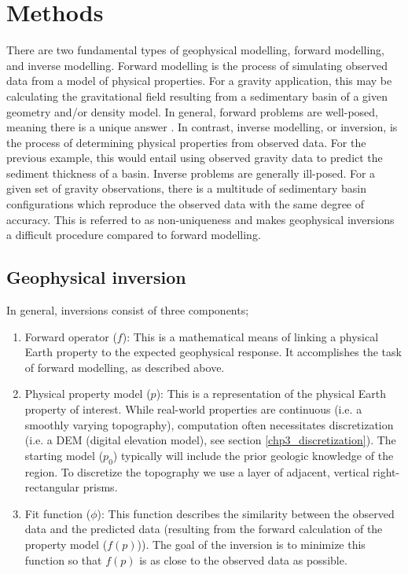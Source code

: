 \section{Methods}

There are two fundamental types of geophysical modelling, forward modelling, and inverse modelling. Forward modelling is the process of simulating observed data from a model of physical properties. For a gravity application, this may be calculating the gravitational field resulting from a sedimentary basin of a given geometry and/or density model. In general, forward problems are well-posed, meaning there is a unique answer \citep{oldenburginversion2005}. In contrast, inverse modelling, or inversion, is the process of determining physical properties from observed data. For the previous example, this would entail using observed gravity data to predict the sediment thickness of a basin. Inverse problems are generally ill-posed. For a given set of gravity observations, there is a multitude of sedimentary basin configurations which reproduce the observed data with the same degree of accuracy. This is referred to as non-uniqueness and makes geophysical inversions a difficult procedure compared to forward modelling.

\subsection{Geophysical inversion}

In general, inversions consist of three components;

\begin{enumerate}
    \item Forward operator ($f$): This is a mathematical means of linking a physical Earth property to the expected geophysical response. It accomplishes the task of forward modelling, as described above.
    \item Physical property model ($p$): This is a representation of the physical Earth property of interest. While real-world properties are continuous (i.e. a smoothly varying topography), computation often necessitates discretization (i.e. a DEM (digital elevation model), see section \ref{chp3_discretization}). The starting model ($p_0$) typically will include the prior geologic knowledge of the region. To discretize the topography we use a layer of adjacent, vertical right-rectangular prisms.
    \item Fit function ($\phi$): This function describes the similarity between the observed data and the predicted data (resulting from the forward calculation of the property model ($f(p)$)). The goal of the inversion is to minimize this function so that $f(p)$ is as close to the observed data as possible. 
\end{enumerate} 

